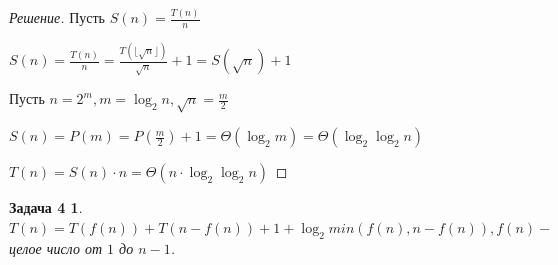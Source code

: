 \documentclass[12pt]{article}
\newenvironment{solution}{\begin{proof}[Решение]}{\end{proof}}
\newtheorem*{task_4}{Задача 4}
\begin{document}
\begin{solution}

	Пусть $S(n) = \frac{T(n)}{n}$

	$S(n) = \frac{T(n)}{n} = 
	\frac{T(\lfloor \sqrt{n} \rfloor)}{\sqrt{n}} + 1 = 
	S(\sqrt{n}) + 1$

	Пусть $n = 2^m, m = \log_2{n}, \sqrt{n} = \frac{m}{2}$

	$S(n) = P(m) = P(\frac{m}{2}) + 1 = \Theta({\log_2{m}}) = 
	\Theta({\log_2{\log_2{n}}})$

	$T(n) = S(n) \cdot n = \Theta(n\cdot\log_2{\log_2{n}})$

\end{solution}







\begin{task_4}

	$T(n) = T(f(n)) + T(n - f(n)) + 1 + \log_2{min(f(n), n - f(n))},
	f(n) - $ целое число от $1$ до $n - 1$.

\end{task_4}
\end{document}
